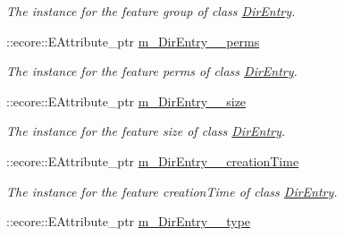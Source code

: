 \begin{DoxyCompactItemize}
\begin{DoxyCompactList}\small\item\em The instance for the feature group of class \hyperlink{classFMS__Data_1_1DirEntry}{DirEntry}. \item\end{DoxyCompactList}\item 
\hypertarget{classFMS__Data_1_1FMS__DataPackage_a87ee0c652f4a1116783f33abac5a4e9e}{
::ecore::EAttribute\_\-ptr \hyperlink{classFMS__Data_1_1FMS__DataPackage_a87ee0c652f4a1116783f33abac5a4e9e}{m\_\-DirEntry\_\-\_\-perms}}
\label{classFMS__Data_1_1FMS__DataPackage_a87ee0c652f4a1116783f33abac5a4e9e}

\begin{DoxyCompactList}\small\item\em The instance for the feature perms of class \hyperlink{classFMS__Data_1_1DirEntry}{DirEntry}. \item\end{DoxyCompactList}\item 
\hypertarget{classFMS__Data_1_1FMS__DataPackage_af9bdcaa48a18dc4d08f4929cf3420885}{
::ecore::EAttribute\_\-ptr \hyperlink{classFMS__Data_1_1FMS__DataPackage_af9bdcaa48a18dc4d08f4929cf3420885}{m\_\-DirEntry\_\-\_\-size}}
\label{classFMS__Data_1_1FMS__DataPackage_af9bdcaa48a18dc4d08f4929cf3420885}

\begin{DoxyCompactList}\small\item\em The instance for the feature size of class \hyperlink{classFMS__Data_1_1DirEntry}{DirEntry}. \item\end{DoxyCompactList}\item 
\hypertarget{classFMS__Data_1_1FMS__DataPackage_a61e7f4b213765a12eb41bc183a1cdf47}{
::ecore::EAttribute\_\-ptr \hyperlink{classFMS__Data_1_1FMS__DataPackage_a61e7f4b213765a12eb41bc183a1cdf47}{m\_\-DirEntry\_\-\_\-creationTime}}
\label{classFMS__Data_1_1FMS__DataPackage_a61e7f4b213765a12eb41bc183a1cdf47}

\begin{DoxyCompactList}\small\item\em The instance for the feature creationTime of class \hyperlink{classFMS__Data_1_1DirEntry}{DirEntry}. \item\end{DoxyCompactList}\item 
\hypertarget{classFMS__Data_1_1FMS__DataPackage_a20bdd304932cd25455033b8229e5a8b5}{
::ecore::EAttribute\_\-ptr \hyperlink{classFMS__Data_1_1FMS__DataPackage_a20bdd304932cd25455033b8229e5a8b5}{m\_\-DirEntry\_\-\_\-type}}
\label{classFMS__Data_1_1FMS__DataPackage_a20bdd304932cd25455033b8229e5a8b5}


\end{DoxyCompactItemize}
